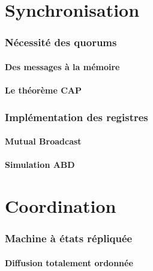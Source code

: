 \documentclass[9pt, handout]{beamer}
\begin{document}
 
\part{Synchronisation}
 
 
\section{Nécessité des quorums}
 
\subsection{Des messages à la mémoire}


 
\subsection{Le théorème CAP}



 
\section{Implémentation des registres}
 
\subsection{Mutual Broadcast}



 
\subsection{Simulation ABD}

 
 
\part{Coordination}
 
 
\section{Machine à états répliquée}
 
\subsection{Diffusion totalement ordonnée}






 
\end{document}
